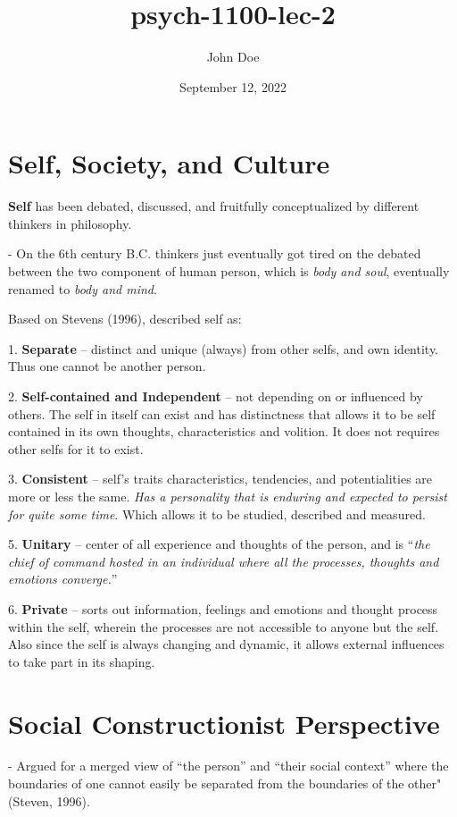 \documentclass[12pt, UTF8]{article}
\title{psych-1100-lec-2}
\author{John Doe}
\date{September 12, 2022}
\begin{document}
	\maketitle
	
	\section*{Self, Society, and Culture}
	
	\textbf{Self} has been debated, discussed, and fruitfully conceptualized by different thinkers in philosophy.
	
	- On the 6th century B.C. thinkers just eventually got tired on the debated between the two component of human person, which is \textit{body and soul}, eventually renamed to \textit{body and mind}.
	
	Based on Stevens (1996), described self as:
	
	1. \textbf{Separate} -- distinct and unique (always) from other selfs, and own identity. Thus one cannot be another person.
	
	2. \textbf{Self-contained and Independent} -- not depending on or influenced by others. The self in itself can exist and has distinctness that allows it to be self contained in its own thoughts, characteristics and volition. It does not requires other selfs for it to exist.
	
	3. \textbf{Consistent} -- self's traits characteristics, tendencies, and potentialities are more or less the same. \textit{Has a personality that is enduring and expected to persist for quite some time}. Which allows it to be studied, described and measured.
	
	5. \textbf{Unitary} -- center of all experience and thoughts of the person, and is ``\textit{the chief of command hosted in an individual where all the processes, thoughts and emotions converge.}''
	
	6. \textbf{Private} -- sorts out information, feelings and emotions and thought process within the self, wherein the processes are not accessible to anyone but the self. Also since the self is always changing and dynamic, it allows external influences to take part in its shaping.
	
	\section{Social Constructionist Perspective}
	
	- Argued for a merged view of ``the person'' and ``their social context'' where the boundaries of one cannot easily be separated from the boundaries of the other" (Steven, 1996).
	
\end{document}
